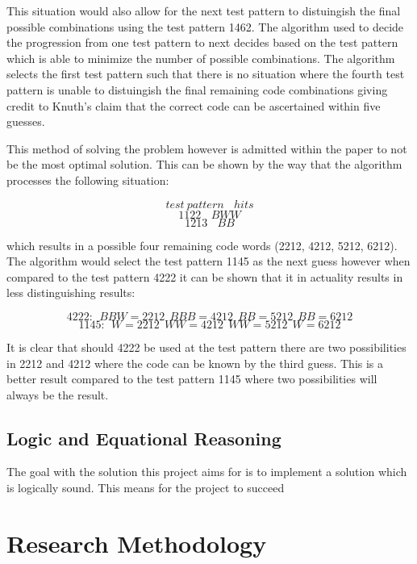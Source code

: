 \documentclass[12pt]{article}  %
\theoremstyle{definition}
\theoremstyle{remark}
\begin{document}
This situation would also allow for the next test pattern to distuingish the final possible combinations using the test pattern 1462. The algorithm used to decide the progression from one test pattern to next decides based on the test pattern which is able to minimize the number of possible combinations. The algorithm selects the first test pattern such that there is no situation where the fourth test pattern is unable to distuingish the final remaining code combinations giving credit to Knuth's claim that the correct code can be ascertained within five guesses.

This method of solving the problem however is admitted within the paper to not be the most optimal solution. This can be shown by the way that the algorithm processes the following situation:

\[ test \ pattern \ \ \ \  hits\]
\[ 1122 \ \ \ \ BWW\]
\[ 1213 \ \ \ \ BB\]

which results in a possible four remaining code words (2212, 4212, 5212, 6212). The algorithm would select the test pattern 1145 as the next guess however when compared to the test pattern 4222 it can be shown that it in actuality results in less distinguishing results:

\[ 4222: \ \ BBW = 2212 \ \ BBB = 4212 \ \ BB = 5212 \ \ BB = 6212 \]
\[ 1145: \ \ W = 2212 \ \ WW = 4212 \ \ WW = 5212 \ \ W = 6212 \]

It is clear that should 4222 be used at the test pattern there are two possibilities in 2212 and 4212 where the code can be known by the third guess. This is a better result compared to the test pattern 1145 where two possibilities will always be the result.


\subsection {Logic and Equational Reasoning}
The goal with the solution this project aims for is to implement a solution which is logically sound. This means for the project to succeed


\newpage                     %
\section{Research Methodology}\label{ss:back}

\newpage                     %
\end{document}
